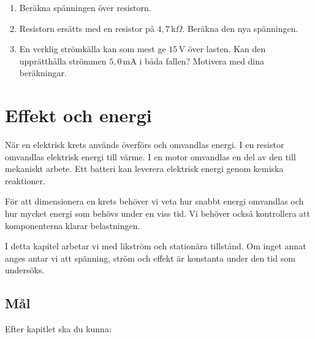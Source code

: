 \documentclass[
  swedish,
  11pt,
  a4paper,
  DIV=11,
  numbers=noendperiod,
  twoside,
  open=any]{scrreprt}
\begin{document}
\begin{enumerate}
  \begin{enumerate}
  \def\labelenumii{\alph{enumii}.}
  \item
    Beräkna spänningen över resistorn.
  \item
    Resistorn ersätts med en resistor på \(4{,}7\,\mathrm{k}\Omega\).
    Beräkna den nya spänningen.
  \item
    En verklig strömkälla kan som mest ge \(15\,\mathrm{V}\) över
    lasten. Kan den upprätthålla strömmen \(5{,}0\,\mathrm{mA}\) i båda
    fallen? Motivera med dina beräkningar.
  \end{enumerate}
\end{enumerate}


\chapter{Effekt och energi}\label{sec-effekt}

När en elektrisk krets används överförs och omvandlas energi. I en
resistor omvandlas elektrisk energi till värme. I en motor omvandlas en
del av den till mekaniskt arbete. Ett batteri kan leverera elektrisk
energi genom kemiska reaktioner.

För att dimensionera en krets behöver vi veta hur snabbt energi
omvandlas och hur mycket energi som behövs under en viss tid. Vi behöver
också kontrollera att komponenterna klarar belastningen.

I detta kapitel arbetar vi med likström och stationära tillstånd. Om
inget annat anges antar vi att spänning, ström och effekt är konstanta
under den tid som undersöks.

\section*{Mål}\label{sec-effekt-mal}


Efter kapitlet ska du kunna:
\end{document}
